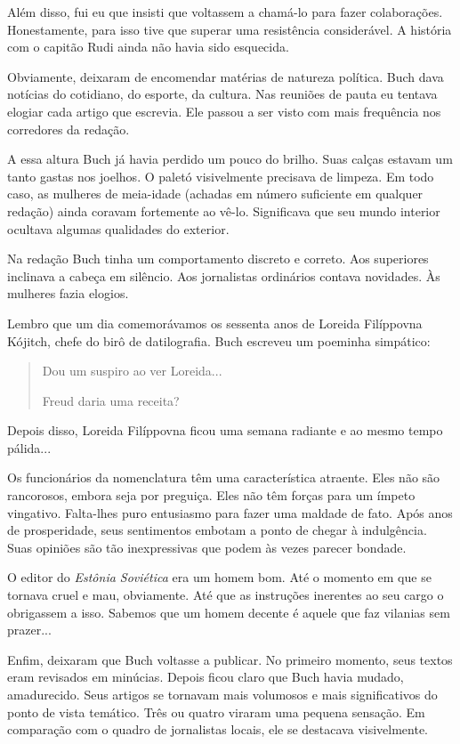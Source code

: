 Além disso, fui eu que insisti que voltassem a chamá-lo para fazer
colaborações. Honestamente, para isso tive que superar uma resistência
considerável. A história com o capitão Rudi ainda não havia sido
esquecida.

Obviamente, deixaram de encomendar matérias de natureza política. Buch
dava notícias do cotidiano, do esporte, da cultura. Nas reuniões de
pauta eu tentava elogiar cada artigo que escrevia. Ele passou a ser
visto com mais frequência nos corredores da redação.

A essa altura Buch já havia perdido um pouco do brilho. Suas calças
estavam um tanto gastas nos joelhos. O paletó visivelmente precisava de
limpeza. Em todo caso, as mulheres de meia-idade (achadas em número
suficiente em qualquer redação) ainda coravam fortemente ao vê-lo.
Significava que seu mundo interior ocultava algumas qualidades do
exterior.

Na redação Buch tinha um comportamento discreto e correto. Aos
superiores inclinava a cabeça em silêncio. Aos jornalistas ordinários
contava novidades. Às mulheres fazia elogios.

Lembro que um dia comemorávamos os sessenta anos de Loreida Filíppovna
Kójitch, chefe do birô de datilografia. Buch escreveu um poeminha
simpático:

\begin{quote}
Dou um suspiro ao ver Loreida...

Freud daria uma receita?
\end{quote}

Depois disso, Loreida Filíppovna ficou uma semana radiante e ao mesmo
tempo pálida...

Os funcionários da nomenclatura têm uma característica atraente. Eles
não são rancorosos, embora seja por preguiça. Eles não têm forças para
um ímpeto vingativo. Falta-lhes puro entusiasmo para fazer uma maldade
de fato. Após anos de prosperidade, seus sentimentos embotam a ponto de
chegar à indulgência. Suas opiniões são tão inexpressivas que podem às
vezes parecer bondade.

O editor do \emph{Estônia Soviética} era um homem bom. Até o momento em
que se tornava cruel e mau, obviamente. Até que as instruções inerentes
ao seu cargo o obrigassem a isso. Sabemos que um homem decente é aquele
que faz vilanias sem prazer...

Enfim, deixaram que Buch voltasse a publicar. No primeiro momento, seus
textos eram revisados em minúcias. Depois ficou claro que Buch havia
mudado, amadurecido. Seus artigos se tornavam mais volumosos e mais
significativos do ponto de vista temático. Três ou quatro viraram uma
pequena sensação. Em comparação com o quadro de jornalistas locais, ele
se destacava visivelmente.

